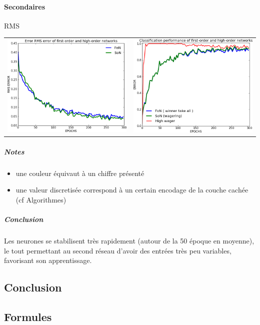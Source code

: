     \paragraph{Secondaires}
      RMS
      \begin{center}
	\begin{tabular}{lr}
	  \hspace*{-1cm}
	  \includegraphics[width=250px]{data/expD2/rms.png}
	  &
	  \includegraphics[width=250px]{data/expD2/perf.png} 
	\end{tabular}
      \end{center} 
      \subparagraph{Notes}
	\begin{itemize}
	  \item une couleur équivaut à un chiffre présenté
	  \item une valeur discretisée correspond à un certain encodage de la couche cachée (cf Algorithmes)
	\end{itemize}
      \subparagraph{Conclusion}
	Les neurones se stabilisent très rapidement (autour de la 50 époque en moyenne), 
	le tout permettant au second réseau d'avoir des entrées très peu variables, favorisant
	son apprentissage.


  \subsection{Conclusion}
  
  

  \newpage 
  \subsection{Formules}
    
    
    
    


